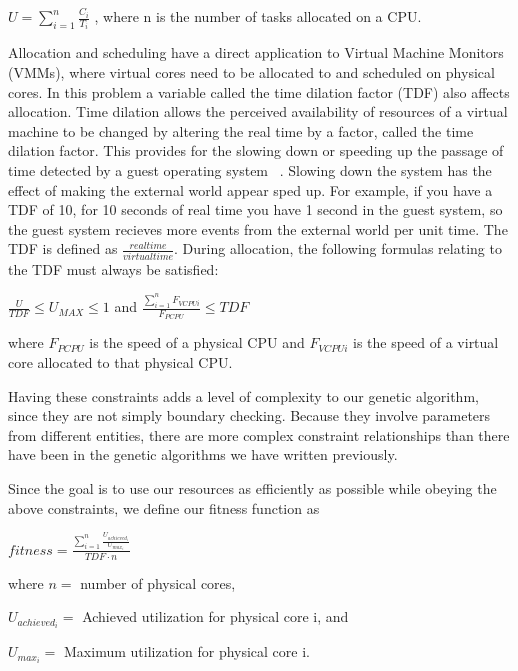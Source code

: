 \documentclass[11pt]{article}
\begin{document}
\begin{center}
$U = \sum_{i=1}^{n} \frac{C_{i}}{T_{i}}$ , where n is the number of tasks allocated on a CPU.
\end{center}

Allocation and scheduling have a direct application to Virtual Machine Monitors (VMMs), where virtual cores need to be allocated to and scheduled on physical cores. In this problem a variable called the time dilation factor (TDF) also affects allocation. Time dilation allows the perceived availability of resources of a virtual machine to be changed by altering the real time by a factor, called the time dilation factor. This provides for the slowing down or speeding up the passage of time detected by a guest operating system ~\cite{Gupta:06}. Slowing down the system has the effect of making the external world appear sped up. For example, if you have a TDF of 10, for 10 seconds of real time you have 1 second in the guest system, so the guest system recieves more events from the external world per unit time. The TDF is defined as $\frac{real time}{virtual time}$. During allocation, the following formulas relating to the TDF must always be satisfied:

\begin{center}
$\frac{U}{TDF} \leq U_{MAX} \leq 1$ and
$\frac{\sum_{i=1}^{n} F_{VCPUi} }{F_{PCPU}} \leq TDF$
\end{center}
\begin{flushleft}
where $F_{PCPU}$ is the speed of a physical CPU and $F_{VCPUi}$ is the speed of a virtual core allocated to that physical CPU. 
\end{flushleft}
Having these constraints adds a level of complexity to our genetic algorithm, since they are not simply boundary checking. Because they involve parameters from different entities, there are more complex constraint relationships than there have been in the genetic algorithms we have written previously.

Since the goal is to use our resources as efficiently as possible while obeying the above constraints, we define our fitness function as

\begin{center}

$fitness = \frac{\sum_{i=1}^{n} \frac{U_{achieved_i}}{U_{max_i}}}{TDF \cdot n}$

\begin{flushleft}
where $n =$ number of physical cores, 

$U_{achieved_{i}} =$ Achieved utilization for physical core i, and

$U_{max_{i}} =$ Maximum utilization for physical core i.
\end{flushleft}

\end{center}
\end{document}
